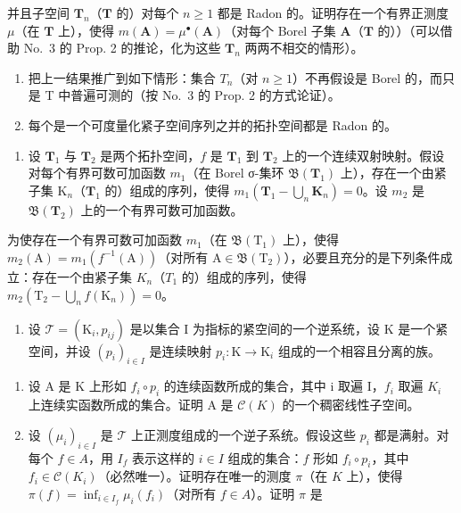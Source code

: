 并且子空间 \(\mathbf{T}_n\)（\(\mathbf{T}\) 的）对每个 \(n \geqslant 1\) 都是 Radon 的。证明存在一个有界正测度 \(\mu\)（在 \(\mathbf{T}\) 上），使得 \(m(\mathbf{A}) = \mu^{\bullet}(\mathbf{A})\)（对每个 Borel 子集 \(\mathbf{A}\)（\(\mathbf{T}\) 的））（可以借助 No.~3 的 Prop. 2 的推论，化为这些 \(\mathbf{T}_n\) 两两不相交的情形）。

\begin{enumerate}
\def\labelenumi{\alph{enumi})}
\setcounter{enumi}{1}
\item
  把上一结果推广到如下情形：集合 \(T_{n}\)（对 \(n \geqslant 1\)）不再假设是 Borel 的，而只是 T 中普遍可测的（按 No.~3 的 Prop. 2 的方式论证）。
\item
  每个是一个可度量化紧子空间序列之并的拓扑空间都是 Radon 的。
\end{enumerate}

\begin{enumerate}
\def\labelenumi{\arabic{enumi})}
\setcounter{enumi}{17}
\tightlist
\item
  设 \(\mathbf{T}_1\) 与 \(\mathbf{T}_2\) 是两个拓扑空间，\(f\) 是 \(\mathbf{T}_1\) 到 \(\mathbf{T}_2\) 上的一个连续双射映射。假设对每个有界可数可加函数 \(m_1\)（在 Borel σ-集环 \(\mathfrak{B}(\mathbf{T}_1)\) 上），存在一个由紧子集 \(\mathrm{K}_n\)（\(\mathbf{T}_1\) 的）组成的序列，使得 \(m_1(\mathbf{T}_1 - \bigcup_{n}\mathbf{K}_n) = 0\)。设 \(m_2\) 是 \(\mathfrak{B}(\mathbf{T}_2)\) 上的一个有界可数可加函数。
\end{enumerate}

为使存在一个有界可数可加函数 \(m_{1}\)（在 \(\mathfrak{B}(\mathrm{T}_{1})\) 上），使得 \(m_{2}(\mathrm{A}) = m_{1}(f^{-1}(\mathrm{A}))\)（对所有 \(\mathrm{A} \in \mathfrak{B}(\mathrm{T}_{2})\)），必要且充分的是下列条件成立：存在一个由紧子集 \(K_{n}\)（\(T_{1}\) 的）组成的序列，使得 \(m_{2}(\mathrm{T}_{2} - \bigcup_{n} f(\mathrm{K}_{n})) = 0\)。

\exercisesection{}

\begin{enumerate}
\def\labelenumi{\arabic{enumi})}
\tightlist
\item
  设 \(\mathcal{T} = (\mathrm{K}_i, p_{ij})\) 是以集合 I 为指标的紧空间的一个逆系统，设 K 是一个紧空间，并设 \((p_i)_{i \in I}\) 是连续映射 \(p_i: \mathrm{K} \to \mathrm{K}_i\) 组成的一个相容且分离的族。
\end{enumerate}

\begin{enumerate}
\def\labelenumi{\alph{enumi})}
\item
  设 A 是 K 上形如 \(f_{i} \circ p_{i}\) 的连续函数所成的集合，其中 i 取遍 I，\(f_{i}\) 取遍 \(K_{i}\) 上连续实函数所成的集合。证明 A 是 \(\mathcal{C}(K)\) 的一个稠密线性子空间。
\item
  设 \((\mu_i)_{i \in I}\) 是 \(\mathcal{T}\) 上正测度组成的一个逆子系统。假设这些 \(p_i\) 都是满射。对每个 \(f \in A\)，用 \(I_f\) 表示这样的 \(i \in I\) 组成的集合：\(f\) 形如 \(f_i \circ p_i\)，其中 \(f_i \in \mathcal{C}(K_i)\)（必然唯一）。证明存在唯一的测度 \(\pi\)（在 \(K\) 上），使得 \(\pi(f) = \inf_{i \in I_f} \mu_i(f_i)\)（对所有 \(f \in A\)）。证明 \(\pi\) 是
\end{enumerate}

